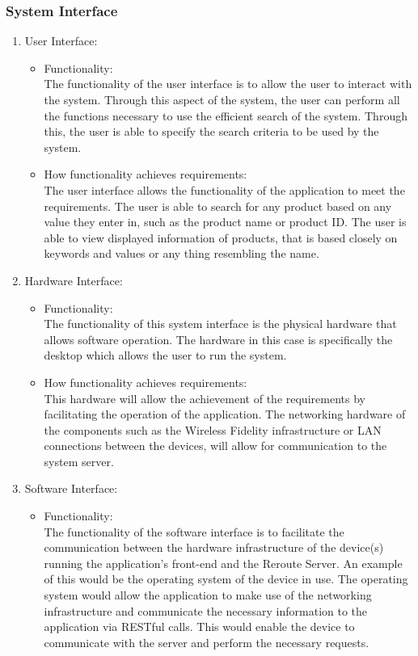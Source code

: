 \documentclass[a4paper,10pt]{article}
\begin{document}
        \subsubsection{System Interface}{
			\begin{enumerate} 
				\item User Interface:
					\begin{itemize}
				\item Functionality:\\
					The functionality of the user interface is to allow the user to interact with the system. Through this aspect of the system, the user can perform all the functions necessary to use the efficient search of the system. Through this, the user is able to specify the search criteria to be used by the system.\\
				\item How functionality achieves requirements:\\	
					The user interface allows the functionality of the application to meet the requirements. The user is able to search for any product based on any value they enter in, such as the product name or product ID. The user is able to view displayed information of products, that is based closely on keywords and values or any thing resembling the name. \\
					\end{itemize}
					
				\item Hardware Interface:
					\begin{itemize}
					\item Functionality:\\
					The functionality of this system interface is the physical hardware that allows software operation. The hardware in this case is specifically the desktop which allows the user to run the system.\\
				\item How functionality achieves requirements:\\
					This hardware will allow the achievement of the requirements by facilitating the operation of the application. The networking hardware of the components such as the Wireless Fidelity infrastructure or LAN connections between the devices, will allow for communication to the system server.
				\end{itemize}
				
				\item Software Interface:
					\begin{itemize}
					\item Functionality:\\
						The functionality of the software interface is to facilitate the communication between the hardware infrastructure of the device(s) running the application's front-end and the Reroute Server. An example of this would be the operating system of the device in use. The operating system would allow the application to make use of the networking infrastructure and communicate the necessary information to the application via RESTful calls. This would enable the device to communicate with the server and perform the necessary requests.\\


\end{itemize}
\end{enumerate}}
\end{document}
